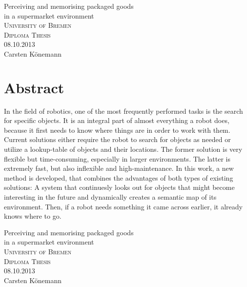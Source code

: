 \begin{center}
  \textsf{\LARGE Perceiving and memorising packaged goods \\ in a supermarket environment}\\[1cm]
  \textsc{University of Bremen}\\
  \textsc{Diploma Thesis}\\[1cm]
  08.10.2013\\
  Carsten K\"onemann\\[3cm]
\end{center}

\vfill

\section*{Abstract}
\begin{multicols}{2}
  In the field of robotics, one of the most frequently performed tasks is the search for specific objects. It is an integral part of almost everything a robot does, because it first needs to know where things are in order to work with them. Current solutions either require the robot to search for objects as needed or utilize a lookup-table of objects and their locations. The former solution is very flexible but time-consuming, especially in larger environments. The latter is extremely fast, but also inflexible and high-maintenance. In this work, a new method is developed, that combines the advantages of both types of existing solutions: A system that continuesly looks out for objects that might become interesting in the future and dynamically creates a semantic map of its environment. Then, if a robot needs something it came across earlier, it already knows where to go.
\end{multicols}

\null\cleardoublepage
\null\clearpage


\begin{center}
  \textsf{\LARGE Perceiving and memorising packaged goods \\ in a supermarket environment}\\[1cm]
  \textsc{University of Bremen}\\
  \textsc{Diploma Thesis}\\[1cm]
  08.10.2013\\
  Carsten K\"onemann\\[3cm]
\end{center}

\vfill

